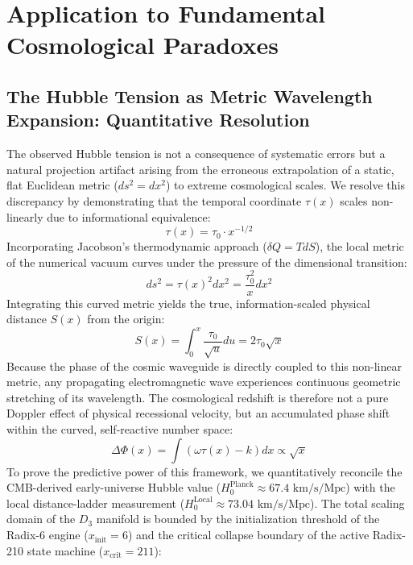 \documentclass[11pt,a4paper]{article}
\theoremstyle{plain}
\theoremstyle{definition}
\theoremstyle{remark}
\begin{document}
\newpage 
\section{Application to Fundamental Cosmological Paradoxes} 

\subsection{The Hubble Tension as Metric Wavelength Expansion: Quantitative Resolution} 
The observed Hubble tension is not a consequence of systematic errors but a natural projection artifact arising from the erroneous extrapolation of a static, flat Euclidean metric ($ds^2 = dx^2$) to extreme cosmological scales. We resolve this discrepancy by demonstrating that the temporal coordinate $\tau(x)$ scales non-linearly due to informational equivalence: 
\begin{equation} 
\tau(x) = \tau_0 \cdot x^{-1/2} 
\end{equation} 
Incorporating Jacobson's thermodynamic approach ($\delta Q = T dS$), the local metric of the numerical vacuum curves under the pressure of the dimensional transition: 
\begin{equation} 
ds^2 = \tau(x)^2 dx^2 = \frac{\tau_0^2}{x} dx^2 
\end{equation} 
Integrating this curved metric yields the true, information-scaled physical distance $S(x)$ from the origin: 
\begin{equation} 
S(x) = \int_0^x \frac{\tau_0}{\sqrt{u}} du = 2 \tau_0 \sqrt{x} 
\end{equation} 
Because the phase of the cosmic waveguide is directly coupled to this non-linear metric, any propagating electromagnetic wave experiences continuous geometric stretching of its wavelength. The cosmological redshift is therefore not a pure Doppler effect of physical recessional velocity, but an accumulated phase shift within the curved, self-reactive number space: 
\begin{equation} 
\Delta\Phi(x) = \int (\omega \tau(x) - k) dx \propto \sqrt{x} 
\end{equation} 
To prove the predictive power of this framework, we quantitatively reconcile the CMB-derived early-universe Hubble value ($H_0^{\text{Planck}} \approx 67.4 \text{ km/s/Mpc}$) with the local distance-ladder measurement ($H_0^{\text{Local}} \approx 73.04 \text{ km/s/Mpc}$). The total scaling domain of the $D_3$ manifold is bounded by the initialization threshold of the Radix-6 engine ($x_{\text{init}} = 6$) and the critical collapse boundary of the active Radix-210 state machine ($x_{\text{crit}} = 211$):
\end{document}
